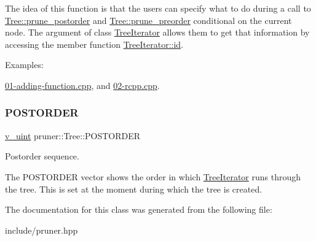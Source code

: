 The idea of this function is that the users can specify what to do during a call to \hyperlink{classpruner_1_1Tree_a7d465880d18acf79f3a772ea5412b0d7}{Tree\+::prune\+\_\+postorder} and \hyperlink{classpruner_1_1Tree_ac85bfb083b3856e65987e1d15885a61c}{Tree\+::prune\+\_\+preorder} conditional on the current node. The argument of class \hyperlink{classpruner_1_1TreeIterator}{Tree\+Iterator} allows them to get that information by accessing the member function \hyperlink{classpruner_1_1TreeIterator_aa0d37262febc59a1b229e98ce610b30a}{Tree\+Iterator\+::id}. \begin{Desc}
\item[Examples\+: ]\par
\hyperlink{01-adding-function_8cpp-example}{01-\/adding-\/function.\+cpp}, and \hyperlink{02-rcpp_8cpp-example}{02-\/rcpp.\+cpp}.\end{Desc}
\mbox{\label{classpruner_1_1Tree_a547937e845fdbceafae4db25cd74f880}} 
\subsubsection{\texorpdfstring{P\+O\+S\+T\+O\+R\+D\+ER}{POSTORDER}}
{\footnotesize\ttfamily \hyperlink{namespacepruner_af0145646bd7ede012cd336b416bc5579}{v\+\_\+uint} pruner\+::\+Tree\+::\+P\+O\+S\+T\+O\+R\+D\+ER\hspace{0.3cm}{\ttfamily [protected]}}



Postorder sequence. 

The P\+O\+S\+T\+O\+R\+D\+ER vector shows the order in which \hyperlink{classpruner_1_1TreeIterator}{Tree\+Iterator} runs through the tree. This is set at the moment during which the tree is created. 

The documentation for this class was generated from the following file\+:\begin{DoxyCompactItemize}
\item 
include/pruner.\+hpp\end{DoxyCompactItemize}
